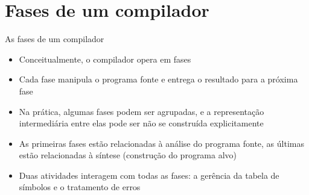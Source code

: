 \section{Fases de um compilador}

\begin{frame}[fragile]{As fases de um compilador}

    \begin{itemize}
        \item Conceitualmente, o compilador opera em fases
        \pause

        \item Cada fase manipula o programa fonte e entrega o resultado para a próxima fase
        \pause

        \item Na prática, algumas fases podem ser agrupadas, e a representação intermediária entre elas pode ser não se construída explicitamente
        \pause

        \item As primeiras fases estão relacionadas à análise do programa fonte, as últimas estão relacionadas à síntese (construção do programa alvo)
        \pause

        \item Duas atividades interagem com todas as fases: a gerência da tabela de símbolos e o tratamento de erros
    \end{itemize}

\end{frame}

